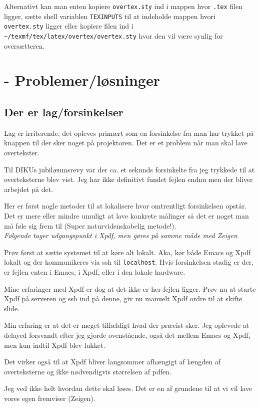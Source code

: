 \documentclass[10pt,a4paper,danish]{article}
\begin{document}
Alternativt kan man enten kopiere \texttt{overtex.sty} ind i mappen hvor \texttt{.tex}
filen ligger, sætte shell variablen \texttt{TEXINPUTS} til at indeholde mappen hvori
\texttt{overtex.sty} ligger eller kopiere filen ind i
\texttt{\~{}/texmf/tex/latex/overtex/overtex.sty} hvor den vil være synlig for oversætteren.

\section{- Problemer/løsninger}
\subsection{Der er lag/forsinkelser}
Lag er irriterende, det opleves primært som en forsinkelse fra man har trykket
på knappen til der sker noget på projektoren. Det er et problem når man skal
lave overtekster.

Til DIKUs jubilæumsrevy var der ca. et sekunds forsinkelte fra jeg trykkede til
at overteksterne blev vist. Jeg har ikke definitivt fundet fejlen endnu men der
bliver arbejdet på det.

Her er først nogle metoder til at lokalisere hvor omtrentligt forsinkelsen
opstår.
Det er mere eller mindre umuligt at lave konkrete målinger så det er noget man
må føle sig frem til (Super naturvidenskabelig metode!).\\
\textit{Følgende tager udgangspunkt i Xpdf, men gøres på samme måde med Zeigen}

Prøv først at sætte systemet til at køre alt lokalt. Aka, kør både Emacs og Xpdf
lokalt og der kommunikeres via ssh til \texttt{localhost}. Hvis forsinkelsen
stadig er der, er fejlen enten i Emacs, i Xpdf, eller i den lokale
hardware.

Mine erfaringer med Xpdf er dog at det ikke er her fejlen ligger.
Prøv nu at starte Xpdf på serveren og ssh ind på denne, giv nu manuelt Xpdf
ordre til at skifte slide.

Min erfaring er at det er meget tilfældigt hvad der præcist sker. Jeg oplevede
at delayed forsvandt efter jeg gjorde ovenstående, også det mellem Emacs og
Xpdf, men kun indtil Xpdf blev lukket.

Det virker også til at Xpdf bliver langsommer afhængigt af længden af
overteksterne og ikke nødvendigvis størrelsen af pdfen.

Jeg ved ikke helt hvordan dette skal løses.
Det er en af grundene til at vi vil lave vores egen fremviser (Zeigen).
\end{document}
